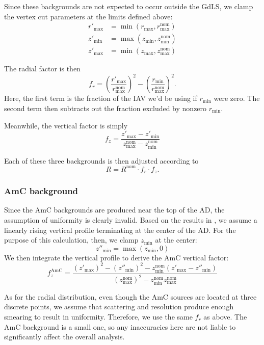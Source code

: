 \documentclass[../thesis.tex]{subfiles}
\begin{document}
Since these backgrounds are not expected to occur outside the GdLS, we clamp the vertex cut parameters at the limits defined above:
\begin{align*}
  r'_{\mathrm{max}} &= \min(r_{\mathrm{max}}, r_{\mathrm{max}}^{\mathrm{nom}})\\
  z'_{\mathrm{min}} &= \max(z_{\mathrm{min}}, z_{\mathrm{min}}^{\mathrm{nom}})\\
  z'_{\mathrm{max}} &= \min(z_{\mathrm{max}}, z_{\mathrm{max}}^{\mathrm{nom}})
\end{align*}

The radial factor is then
\[
  f_r = \left(\frac{r'_{\mathrm{max}}}{r_{\mathrm{max}}^{\mathrm{nom}}}\right)^2 - \left(\frac{r_{\mathrm{min}}}{r_{\mathrm{max}}^{\mathrm{nom}}} \right)^2.
\]
Here, the first term is the fraction of the IAV we'd be using if $r_{\mathrm{min}}$ were zero. The second term then subtracts out the fraction excluded by nonzero $r_{\mathrm{min}}$.

Meanwhile, the vertical factor is simply
\[
  f_z = \frac{z'_{\mathrm{max}} - z'_{\mathrm{min}}}{z_{\mathrm{max}}^{\mathrm{nom}} - z_{\mathrm{min}}^{\mathrm{nom}}}
\]

Each of these three backgrounds is then adjusted according to
\[
  R = R^{\mathrm{nom}} \cdot f_r \cdot f_z.
\]

\subsubsection{AmC background}

Since the AmC backgrounds are produced near the top of the AD, the assumption of uniformity is clearly invalid. Based on the results in \cite{Gu_2016}, we assume a linearly rising vertical profile terminating at the center of the AD.
For the purpose of this calculation, then, we clamp $z_{\mathrm{min}}$ at the center:
\[
  z''_{\mathrm{min}} = \max(z_{\mathrm{min}}, 0)
\]
We then integrate the vertical profile to derive the AmC vertical factor:
\[
  f_z^{\mathrm{AmC}} = \frac{(z'_{\mathrm{max}})^2 - (z''_{\mathrm{min}})^2 - z_{\mathrm{min}}^{\mathrm{nom}} (z'_{\mathrm{max}} - z''_{\mathrm{min}})} {(z_{\mathrm{max}}^{\mathrm{nom}})^2 - z_{\mathrm{min}}^{\mathrm{nom}} z_{\mathrm{max}}^{\mathrm{nom}}} 
\]

As for the radial distribution, even though the AmC sources are located at three discrete points, we assume that scattering and resolution produce enough smearing to result in uniformity. Therefore, we use the same $f_r$ as above. The AmC background is a small one, so any inaccuracies here are not liable to significantly affect the overall analysis.
\end{document}
